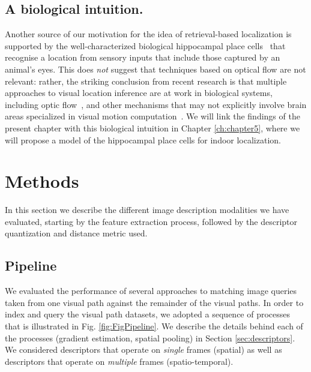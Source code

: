 \subsection{A biological intuition.} Another source of our motivation for the idea of retrieval-based localization is supported by the well-characterized biological hippocampal place cells~\cite{burgess2002human} that recognise a location from sensory inputs that include those captured by an animal's eyes. This does {\it not} suggest that techniques based on optical flow are not relevant: rather, the striking conclusion from recent research is that multiple approaches to visual location inference are at work in biological systems, including optic flow~\cite{Layton2014}, and other mechanisms that may not explicitly involve brain areas specialized in visual motion computation~\cite{Hartley2014space}. We will link the findings of the present chapter with this biological intuition in Chapter \ref{ch:chapter5}, where we will propose a model of the hippocampal place cells for indoor localization.


\section{Methods}
\label{sec:methods}

In this section we describe the different image description modalities we have evaluated, starting by the feature extraction process, followed by the descriptor quantization and distance metric used.

\subsection{Pipeline}

We evaluated the performance of several approaches to matching image queries taken from one visual path against the remainder of the visual paths.  In order to index and query the visual path datasets, we adopted a sequence of processes that is illustrated in Fig. \ref{fig:FigPipeline}.  We describe the details behind each of the processes (\eg gradient estimation, spatial pooling) in Section \ref{sec:descriptors}.  We considered descriptors that operate on {\em single} frames (spatial) as well as descriptors that operate on {\em multiple} frames (spatio-temporal).

